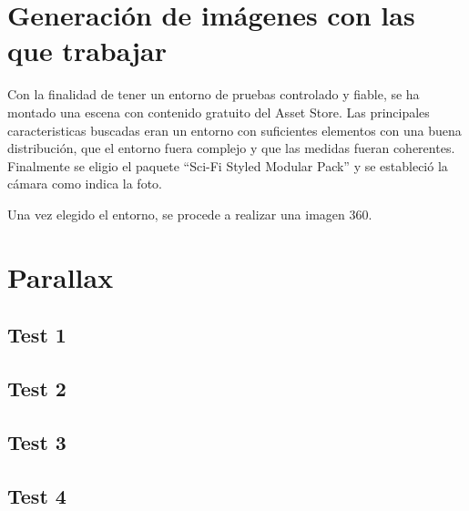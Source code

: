 \section{Generación de imágenes con las que trabajar}
Con la finalidad de tener un entorno de pruebas controlado y fiable, se ha montado una escena con contenido gratuito del Asset Store. Las principales caracteristicas buscadas eran un entorno con suficientes elementos con una buena distribución, que el entorno fuera complejo y que las medidas fueran coherentes. Finalmente se eligio el paquete ``Sci-Fi Styled Modular Pack'' y se estableció la cámara como indica la foto.


Una vez elegido el entorno, se procede a realizar una imagen 360.


\section{Parallax}
\subsection{Test 1}
\subsection{Test 2}
\subsection{Test 3}
\subsection{Test 4}


















